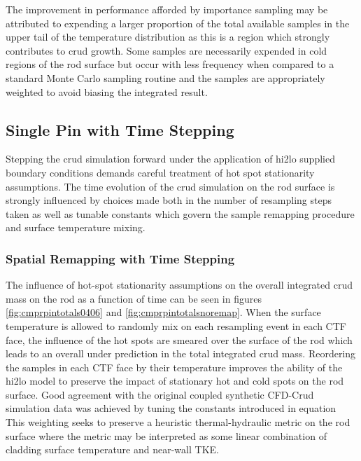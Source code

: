 The improvement in performance afforded by importance sampling may be attributed to expending a larger proportion of the total available samples in the upper tail of the temperature distribution as this is a region which strongly contributes to crud growth.  Some samples are necessarily expended in cold regions of the rod surface but occur with less frequency when compared to a standard Monte Carlo sampling routine and the samples are appropriately weighted to avoid biasing the integrated result.


\subsection{Single Pin with Time Stepping}

Stepping the crud simulation forward under the application of hi2lo supplied boundary conditions demands careful treatment of hot spot stationarity assumptions.  The time evolution of the crud simulation on the rod surface is strongly influenced by choices made both in the number of resampling steps taken as well as tunable constants which govern the sample remapping procedure and surface temperature mixing.

\subsubsection{Spatial Remapping with Time Stepping}

The influence of hot-spot stationarity assumptions on the overall integrated crud mass on the rod as a function of time can be seen in figures \ref{fig:cmprpintotals0406} and \ref{fig:cmprpintotalsnoremap}.  When the surface temperature is allowed to randomly mix on each resampling event in each CTF face, the influence of the hot spots are smeared over the surface of the rod which leads to an overall under prediction in the total integrated crud mass.  Reordering the samples in each CTF face by their temperature improves the ability of the hi2lo model to preserve the impact of stationary hot and cold spots on the rod surface.  Good agreement with the original coupled synthetic CFD-Crud simulation data was achieved by tuning the constants introduced in equation %
This weighting seeks to preserve a heuristic thermal-hydraulic metric on the rod surface  where the metric may be interpreted as some linear combination of cladding surface temperature and near-wall TKE.


